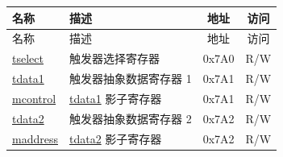 \begin{longtable}{ | p{4.0cm} | p{8.4cm} | c | c| }
\hline\rowcolor{lightgray}
名称 & 描述 & 地址 & 访问 \\ \hline
\endfirsthead
\hline
\rowcolor{lightgray}
名称 & 描述 & 地址 & 访问 \\ \hline
\endhead
\endfoot

\hyperref[regdesc:LPTSELECT]{tselect} & 触发器选择寄存器 & 0x7A0 & R/W \\\hline
\hyperref[regdesc:LPTDATA1]{tdata1} & 触发器抽象数据寄存器 1 & 0x7A1 & R/W \\\hline
\hyperref[regdesc:LPMCONTROL]{mcontrol} & \hyperref[regdesc:LPTDATA1]{tdata1} 影子寄存器  & 0x7A1 & R/W \\\hline
\hyperref[regdesc:LPTDATA2]{tdata2} & 触发器抽象数据寄存器 2 & 0x7A2 & R/W \\\hline
\hyperref[regdesc:LPTDATA2]{maddress} & \hyperref[regdesc:LPTDATA2]{tdata2} 影子寄存器 & 0x7A2 & R/W \\\hline
\end{longtable}